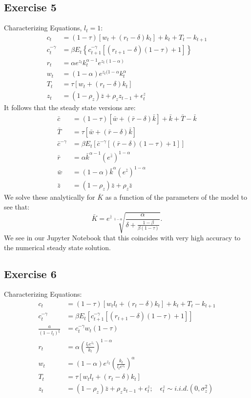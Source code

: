\documentclass[UTF8]{article}
\begin{document}
\subsection*{Exercise 5}
Characterizing Equations, $l_t = 1$: 
\begin{align*}
c_{t}&=(1-\tau)\left[w_{t}+\left(r_{t}-\delta\right) k_{t}\right]+k_{t}+T_{t}-k_{t+1} \\
c_{t}^{-\gamma}&=\beta E_t\left\{c_{t+1}^{-\gamma}\left[\left(r_{t+1}-\delta\right)(1-\tau)+1\right]\right\} \\
r_{t}&=\alpha e^{z_{t}} k_{t}^{\alpha-1} e^{z_t(1-\alpha)} \\
w_{t}&=(1-\alpha)e^{z_{t}(1-\alpha} k_{t}^{\alpha}\\
T_t &= \tau\left[w_{t} +\left(r_{t}-\delta\right) k_{t}\right] \\
z_{t}&=\left(1-\rho_{z}\right) \overline{z}+\rho_{z} z_{t-1}+\epsilon_{t}^{z}
\end{align*}
It follows that the steady state versions are:
\begin{align*}
	\bar{c} &= (1 - \tau)[\bar{w}+ (\bar{r} - \delta) \bar{k}] + \bar{k} + \bar{T} - \bar{k} \\
	\bar{T} &= \tau [\bar{w} + (\bar{r}- \delta)\bar{k} ] \\
	\bar{c} ^{-\gamma} &= \beta E_t \left[ \bar{c}^{-\gamma} [(\bar{r} - \delta)(1 - \tau) + 1] \right] \\
	\bar{r} &= \alpha \bar{k} ^{\alpha - 1} (e^{\bar{z}})^{1 - \alpha} \\
	\bar{w} &= (1 - \alpha) \bar{k} ^{\alpha} (e^{\bar{z}})^{1 - \alpha} \\
	\bar{z} &= (1 - \rho_z)\bar{z} + \rho_z \bar{z}
\end{align*}
We solve these analytically for $\bar{K}$ as a function of the parameters of the model to see that:
$$\bar{K} = e^{\bar{z}}  \sqrt[1-\alpha]{\frac{\alpha}{\delta + \frac{1-\beta}{\beta (1-\tau)}}}.$$ We see in our Jupyter Notebook that this coincides with very high accuracy to the numerical steady state solution. 

\subsection*{Exercise 6}
Characterizing Equations:
\begin{align*}
	c_t &= (1 - \tau)[w_tl_t + (r_t -\delta)k_t] + k_t + T_t - k_{t+1} \\
	c_t ^{-\gamma} &= \beta E_t\left[ c_{t+1}^{-\gamma} [(r_{t+1} - \delta)(1 - \tau) + 1]\right] \\
	\frac{a}{(1-l_t)^{\xi}} &= c_t ^{-\gamma} w_t (1-\tau) \\
	r_t &= \alpha \left( \frac{l_t e^{z_t}}{k_t} \right)^{1 - \alpha} \\
	w_t &= (1 - \alpha) e^{z_t} \left( \frac{k_t}{l_t e^{z_t}} \right)^{\alpha} \\
	 T_t &= \tau[w_tl_t + (r_t - \delta)k_t] \\
	z_t &= (1-\rho_z)\bar{z} + \rho_z z_{t-1} + \epsilon^z_t; \quad \epsilon^z_t \sim i.i.d. (0, \sigma^2_z)
\end{align*}
\end{document}
